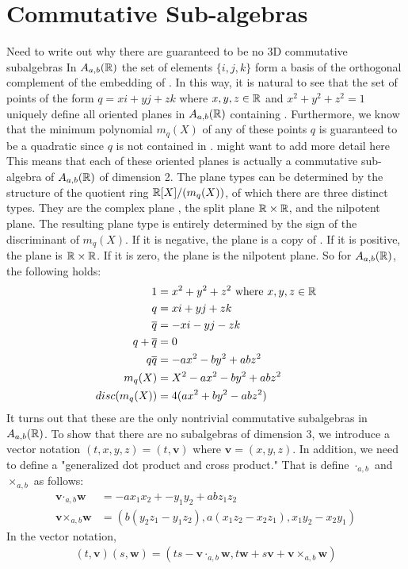 \documentclass{article}
\begin{document}
\section{Commutative Sub-algebras}
{\color{blue} Need to write out why there are guaranteed to be no 3D commutative subalgebras}
In $A_{a,b}(\protect\mathbb{R})$ the set of elements $\{i, j, k\}$ form a basis of the orthogonal complement of the embedding of \bR. In this way, it is natural to see that the set of points of the form $q = xi+yj+zk$ where $x,y,z \in \protect\mathbb{R}$ and $x^2+y^2+z^2 = 1$ uniquely define all oriented planes in $A_{a,b}(\protect\mathbb{R})$ containing \bR. Furthermore, we know that the minimum polynomial $m_q(X)$ of any of these points $q$ is guaranteed to be a quadratic since $q$ is not contained in \bR. {\color{blue} might want to add more detail here} This means that each of these oriented planes is actually a commutative sub-algebra of $A_{a,b}(\protect\mathbb{R})$ of dimension 2. The plane types can be determined by the structure of the quotient ring $\protect\mathbb{R}[X]/(m_q(X))$, of which there are three distinct types. They are the complex plane \bC, the split plane $\protect\mathbb{R}\times\protect\mathbb{R}$, and the nilpotent plane. The resulting plane type is entirely determined by the sign of the discriminant of $m_q(X)$. If it is negative, the plane is a copy of \bC. If it is positive, the plane is $\protect\mathbb{R} \times \protect\mathbb{R}$. If it is zero, the plane is the nilpotent plane. So for $A_{a,b}(\protect\mathbb{R})$, the following holds:
\begin{align*}
    1 &= x^2+y^2+z^2 \text{ where } x,y,z \in \bR \\
    q &= xi + yj +zk \\ %
    \overline{q} &= -xi -yj -zk \\ 
    q+\overline{q} &= 0 \\
    q\overline{q} &= - ax^2 - by^2 + abz^2 \\
    m_q(X) &= X^2 - ax^2 - by^2 + abz^2 \\
    disc(m_q(X)) &= 4(ax^2 + by^2 - abz^2)
\end{align*}
It turns out that these are the only nontrivial commutative subalgebras in $A_{a,b}(\protect\mathbb{R})$. To show that there are no subalgebras of dimension 3, we introduce a vector notation $(t,x,y,z) = (t,\textbf{v})$ where $\textbf{v} = (x,y,z)$. In addition, we need to define a "generalized dot product and cross product." That is define $\cdot_{a,b}$ and $\times_{a,b}$ as follows:
\begin{align*}
    \textbf{v}\cdot_{a,b}\textbf{w} &= -ax_1x_2 + -y_1y_2 + abz_1z_2 \\ 
    \textbf{v}\times_{a,b}\textbf{w} &= (b(y_2z_1 - y_1z_2), a(x_1z_2 - x_2z_1), x_1y_2-x_2y_1)
\end{align*}
In the vector notation,
\begin{align*}
    (t,\textbf{v})(s,\textbf{w}) = (ts - \textbf{v}\cdot_{a,b}\textbf{w},  t\textbf{w} + s\textbf{v} + \textbf{v}\times_{a,b}\textbf{w})
\end{align*}
\end{document}
